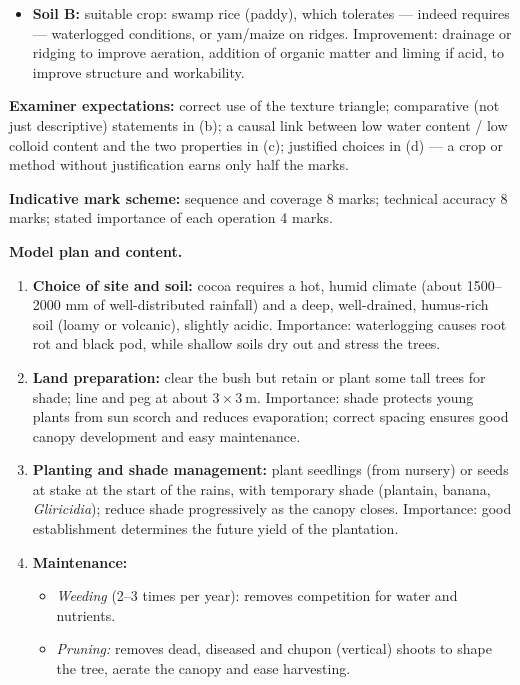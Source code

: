 \documentclass[11pt]{article}
\begin{document}
\begin{corrige}
\begin{enumerate}
\begin{itemize}
\item \textbf{Soil B:} suitable crop: swamp rice (paddy), which tolerates — indeed requires — waterlogged conditions, or yam/maize on ridges. Improvement: drainage or ridging to improve aeration, addition of organic matter and liming if acid, to improve structure and workability.
\end{itemize}
\end{enumerate}
\textbf{Examiner expectations:} correct use of the texture triangle; comparative (not just descriptive) statements in (b); a causal link between low water content / low colloid content and the two properties in (c); justified choices in (d) — a crop or method without justification earns only half the marks.
\end{corrige}

\begin{corrige}
\textbf{Indicative mark scheme:} sequence and coverage 8 marks; technical accuracy 8 marks; stated importance of each operation 4 marks.\par
\textbf{Model plan and content.}
\begin{enumerate}
\item \textbf{Choice of site and soil:} cocoa requires a hot, humid climate (about 1500--2000 mm of well-distributed rainfall) and a deep, well-drained, humus-rich soil (loamy or volcanic), slightly acidic. Importance: waterlogging causes root rot and black pod, while shallow soils dry out and stress the trees.
\item \textbf{Land preparation:} clear the bush but retain or plant some tall trees for shade; line and peg at about $3 \times 3\ \mathrm{m}$. Importance: shade protects young plants from sun scorch and reduces evaporation; correct spacing ensures good canopy development and easy maintenance.
\item \textbf{Planting and shade management:} plant seedlings (from nursery) or seeds at stake at the start of the rains, with temporary shade (plantain, banana, \emph{Gliricidia}); reduce shade progressively as the canopy closes. Importance: good establishment determines the future yield of the plantation.
\item \textbf{Maintenance:}
\begin{itemize}
\item \emph{Weeding} (2--3 times per year): removes competition for water and nutrients.
\item \emph{Pruning:} removes dead, diseased and chupon (vertical) shoots to shape the tree, aerate the canopy and ease harvesting.

\end{itemize}
\end{enumerate}
\end{corrige}
\end{document}
